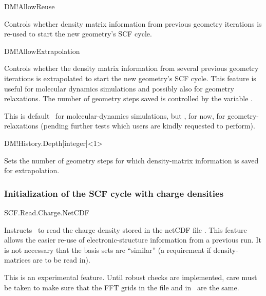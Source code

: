 \begin{fdflogicalT}{DM!AllowReuse}

  Controls whether density matrix information from previous geometry
  iterations is re-used to start the new geometry's SCF cycle.
  
\end{fdflogicalT}

\begin{fdflogicalT}{DM!AllowExtrapolation}

  Controls whether the density matrix information from several
  previous geometry iterations is extrapolated to start the new
  geometry's SCF cycle.  This feature is useful for molecular dynamics
  simulations and possibly also for geometry relaxations.  The number
  of geometry steps saved is controlled by the variable
  .

  This is default \fdftrue\ for molecular-dynamics simulations, but
  \fdffalse, for now, for geometry-relaxations (pending further tests
  which users are kindly requested to perform).

\end{fdflogicalT}


\begin{fdfentry}{DM!History.Depth}[integer]<1>

  Sets the number of geometry steps for which density-matrix information
  is saved for extrapolation.
  
\end{fdfentry}



\subsubsection{Initialization of the SCF cycle with charge densities}


\begin{fdflogicalF}{SCF.Read.Charge.NetCDF}

  Instructs \siesta\ to read the charge density stored in the netCDF
  file . This feature allows the easier re-use of
  electronic-structure information from a previous run. It is not
  necessary that the basis sets are ``similar'' (a requirement if
  density-matrices are to be read in).

  \note This is an experimental feature. Until robust checks are
  implemented, care must be taken to make sure that the FFT grids in
  the  file and in \siesta\ are the same.

\end{fdflogicalF}


